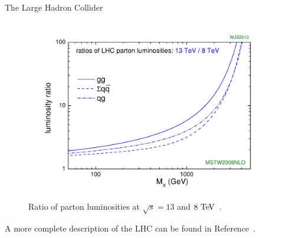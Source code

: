 \begin{section}{The Large Hadron Collider}
\begin{figure}[tbp!]
\begin{center}
\includegraphics[angle=0,width=0.80\columnwidth]{fig/parton_lumi.pdf}
\end{center}
\caption{Ratio of parton luminosities at $\sqrt{s} = 13$ and $8~\mathrm{Te\kern -0.1em V}$~\cite{parton_lumi}.}
\label{fig:parton_lumi}
\end{figure}

A more complete description of the LHC can be found in Reference~\cite{Evans:2008zzb}.

\end{section}

